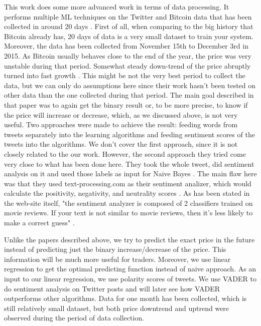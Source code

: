 \documentclass[a4paper,11pt,oneside]{article}
\begin{document}
  This work does some more advanced work in terms of data processing. It performs multiple ML techniques on the Twitter and Bitcoin data that has been collected in around 20 days \cite{related2}. First of all, when comparing to the big history that Bitcoin already has, 20 days of data is a very small dataset to train your system. Moreover, the data has been collected from November 15th to December 3rd in 2015. As Bitcoin usually behaves close to the end of the year, the price was very unstable during that period. Somewhat steady down-trend of the price abruptly turned into fast growth \cite{pricechart}. This might be not the very best period to collect the data, but we can only do assumptions here since their work hasn't been tested on other data than the one collected during that period.
  The main goal described in that paper was to again get the binary result or, to be more precise, to know if the price will increase or decrease, which, as we discussed above, is not very useful. Two approaches were made to achieve the result: feeding words from tweets separately into the learning algorithms and feeding sentiment scores of the tweets into the algorithms. We don't cover the first approach, since it is not closely related to the our work. However, the second approach they tried come very close to what has been done here. They took the whole tweet, did sentiment analysis on it and used those labels as input for Naive Bayes \cite{related2}. The main flaw here was that they used text-processing.com as their sentiment analizer, which would calculate the positivity, negativity, and neutrality scores \cite{related2}. As has been stated in the web-site itself, "the sentiment analyzer is composed of 2 classifiers trained on movie reviews. If your text is not similar to movie reviews, then it's less likely to make a correct guess" \cite{textprocessingfaq}.
  
  
  Unlike the papers described above, we try to predict the exact price in the future instead of predicting just the binary increase/decrease of the price. This information will be much more useful for traders. Moreover, we use linear regression to get the optimal predicting function instead of naive approach. As an input to our linear regression, we use polarity scores of tweets. We use VADER to do sentiment analysis on Twitter posts and will later see how VADER outperforms other algorithms. Data for one month has been collected, which is still relatively small dataset, but both price downtrend and uptrend were observed during the period of data collection.
\end{document}
